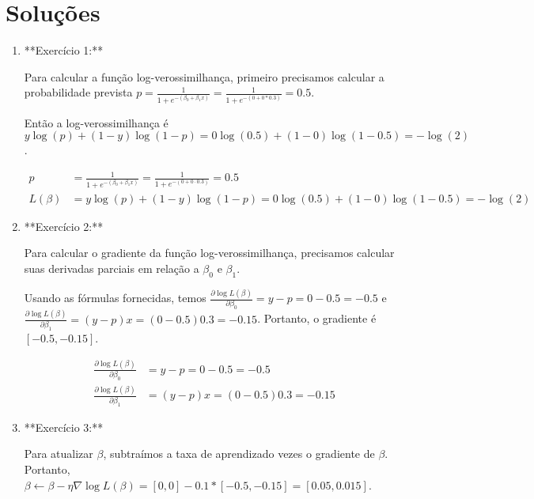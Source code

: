 \documentclass[12pt,a4paper, brazil]{article}
\begin{document}
\pagebreak

\section{Soluções}

\begin{enumerate}

  \item **Exercício 1:** 
   
Para calcular a função log-verossimilhança, primeiro precisamos calcular a probabilidade prevista $p = \frac{1}{1+e^{-(\beta_0 + \beta_1x)}} = \frac{1}{1+e^{-(0 + 0*0.3)}} = 0.5$. 

Então a log-verossimilhança é $y \log(p) + (1 - y) \log(1 - p) = 0 \log(0.5) + (1 - 0) \log(1 - 0.5) = -\log(2)$.



\begin{equation*}
\begin{split}
p &= \frac{1}{1+e^{-(\beta_0 + \beta_1x)}} = \frac{1}{1+e^{-(0 + 0 \cdot 0.3)}} = 0.5 \\
L(\beta) &= y \log(p) + (1 - y) \log(1 - p) = 0 \log(0.5) + (1 - 0) \log(1 - 0.5) = -\log(2)
\end{split}
\end{equation*}


\item  **Exercício 2:**

Para calcular o gradiente da função log-verossimilhança, precisamos calcular suas derivadas parciais em relação a $\beta_0$ e $\beta_1$. 

Usando as fórmulas fornecidas, temos $\frac{\partial \log L(\beta)}{\partial \beta_0} = y - p = 0 - 0.5 = -0.5$ e $\frac{\partial \log L(\beta)}{\partial \beta_1} = (y - p)x = (0 - 0.5)0.3 = -0.15$. Portanto, o gradiente é $[-0.5, -0.15]$.


\begin{equation*}
\begin{split}
\frac{\partial \log L(\beta)}{\partial \beta_0} &= y - p = 0 - 0.5 = -0.5 \\
\frac{\partial \log L(\beta)}{\partial \beta_1} &= (y - p)x = (0 - 0.5)0.3 = -0.15
\end{split}
\end{equation*}


\item  **Exercício 3:**

Para atualizar $\beta$, subtraímos a taxa de aprendizado vezes o gradiente de $\beta$. Portanto, $\beta \leftarrow \beta - \eta \nabla \log L(\beta) = [0, 0] - 0.1 * [-0.5, -0.15] = [0.05, 0.015]$.



\end{enumerate}
\end{document}
